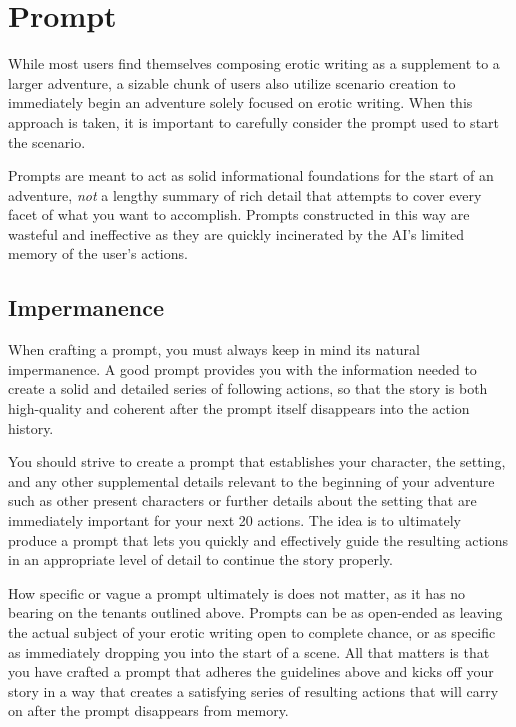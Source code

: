 \documentclass[Coomer-main.tex]{subfiles}
\begin{document}
\chapter{Prompt}
\label{ch:prompt}

While most users find themselves composing erotic writing as a supplement to a larger adventure, a sizable chunk of users also utilize scenario creation to immediately begin an adventure solely focused on erotic writing.
When this approach is taken, it is important to carefully consider the prompt used to start the scenario.

Prompts are meant to act as solid informational foundations for the start of an adventure, \emph{not} a lengthy summary of rich detail that attempts to cover every facet of what you want to accomplish.
Prompts constructed in this way are wasteful and ineffective as they are quickly incinerated by the AI’s limited memory of the user’s actions.

\section{Impermanence}
\label{sec:impermanence}

When crafting a prompt, you must always keep in mind its natural impermanence.
A good prompt provides you with the information needed to create a solid and detailed series of following actions, so that the story is both high-quality and coherent after the prompt itself disappears into the action history.

You should strive to create a prompt that establishes your character, the setting, and any other supplemental details relevant to the beginning of your adventure such as other present characters or further details about the setting that are immediately important for your next 20 actions.
The idea is to ultimately produce a prompt that lets you quickly and effectively guide the resulting actions in an appropriate level of detail to continue the story properly.

How specific or vague a prompt ultimately is does not matter, as it has no bearing on the tenants outlined above.
Prompts can be as open-ended as leaving the actual subject of your erotic writing open to complete chance, or as specific as immediately dropping you into the start of a scene.
All that matters is that you have crafted a prompt that adheres the guidelines above and kicks off your story in a way that creates a satisfying series of resulting actions that will carry on after the prompt disappears from memory.
\end{document}
